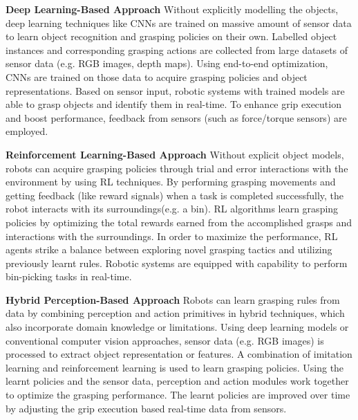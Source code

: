 \vspace{5mm}

\textbf{Deep Learning-Based Approach} Without explicitly modelling the objects, deep learning techniques like \ac{CNN}s are trained on massive amount of sensor data to learn object recognition and grasping policies on their own. Labelled object instances and corresponding grasping actions are collected from large datasets of sensor data (e.g. \ac{RGB} images, depth maps). Using end-to-end optimization, \ac{CNN}s are trained on those data to acquire grasping policies and object representations. Based on sensor input, robotic systems with trained models are able to grasp objects and identify them in real-time. To enhance grip execution and boost performance, feedback from sensors (such as force/torque sensors) are employed.\cite{bousmalis2018using}

\vspace{5mm}

\textbf{Reinforcement Learning-Based Approach} Without explicit object models, robots can acquire grasping policies through trial and error interactions with the environment by using \ac{RL} techniques. By performing grasping movements and getting feedback (like reward signals) when a task is completed successfully, the robot interacts with its surroundings(e.g. a bin). \ac{RL} algorithms learn grasping policies by optimizing the total rewards earned from the accomplished grasps and interactions with the surroundings. In order to maximize the performance, \ac{RL} agents strike a balance between exploring novel grasping tactics and utilizing previously learnt rules. Robotic systems are equipped with capability to perform bin-picking tasks in real-time.\cite{levine2018learning}

\vspace{5mm}

\textbf{Hybrid Perception-Based Approach} Robots can learn grasping rules from data by combining perception and action primitives in hybrid techniques, which also incorporate domain knowledge or limitations. Using deep learning models or conventional computer vision approaches, sensor data (e.g. \ac{RGB} images) is processed to extract object representation or features. A combination of  imitation learning and reinforcement learning is used to learn grasping policies. Using the learnt policies and the sensor data, perception and action modules work together to optimize the grasping performance. The learnt policies are improved over time by adjusting the grip execution based real-time data from sensors.\cite{jang2018grasp2vec} 

